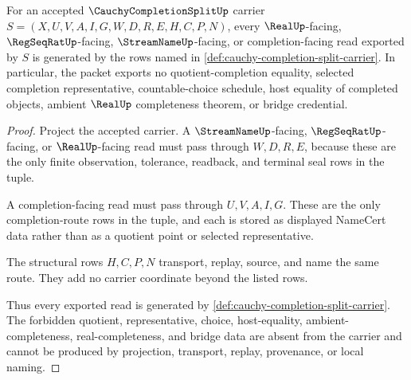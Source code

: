 \begin{theorem}
\label{thm:cauchy-completion-split-nonescape}
For an accepted $\CauchyCompletionSplitUp$ carrier $S=(X,U,V,A,I,G,W,D,R,E,H,C,P,N)$, every $\RealUp$-facing, $\RegSeqRatUp$-facing, $\StreamNameUp$-facing, or completion-facing read exported by $S$ is generated by the rows named in \autoref{def:cauchy-completion-split-carrier}. In particular, the packet exports no quotient-completion equality, selected completion representative, countable-choice schedule, host equality of completed objects, ambient $\RealUp$ completeness theorem, or bridge credential.
\end{theorem}
\begin{proof}
Project the accepted carrier. A $\StreamNameUp$-facing, $\RegSeqRatUp$-facing, or $\RealUp$-facing read must pass through $W,D,R,E$, because these are the only finite observation, tolerance, readback, and terminal seal rows in the tuple.

A completion-facing read must pass through $U,V,A,I,G$. These are the only completion-route rows in the tuple, and each is stored as displayed NameCert data rather than as a quotient point or selected representative.

The structural rows $H,C,P,N$ transport, replay, source, and name the same route. They add no carrier coordinate beyond the listed rows.

Thus every exported read is generated by \autoref{def:cauchy-completion-split-carrier}. The forbidden quotient, representative, choice, host-equality, ambient-completeness, real-completeness, and bridge data are absent from the carrier and cannot be produced by projection, transport, replay, provenance, or local naming.
\end{proof}

\begin{closurestatus}{\CauchyCompletionSplitUp}
  \theoryclosure{\seedClosure}
  \formalstatus{\unformalizedV}
\end{closurestatus}
